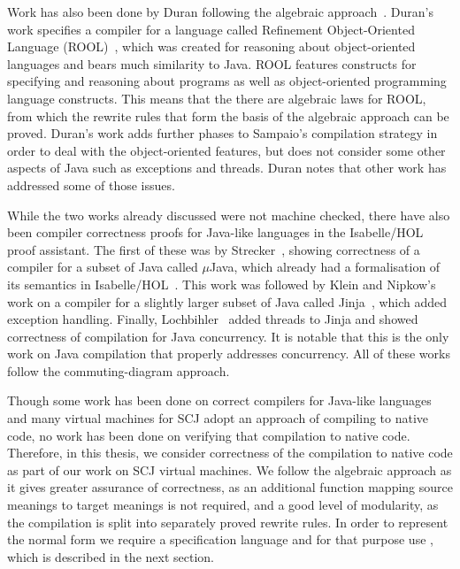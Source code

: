 Work has also been done by Duran following the algebraic
approach~\cite{duran2005, duran2010}.
Duran's work specifies a compiler for a language called Refinement
Object-Oriented Language (ROOL)~\cite{borba2000}, which was created
for reasoning about object-oriented languages and bears much
similarity to Java.
ROOL features constructs for specifying and reasoning about programs
as well as object-oriented programming language constructs.
This means that the there are algebraic laws for ROOL, from which the
rewrite rules that form the basis of the algebraic approach can be
proved.
Duran's work adds further phases to Sampaio's compilation strategy in
order to deal with the object-oriented features, but does not consider
some other aspects of Java such as exceptions and threads.
Duran notes that other work has addressed some of those issues.

While the two works already discussed were not machine checked, there
have also been compiler correctness proofs for Java-like languages in
the Isabelle/HOL proof assistant.
The first of these was by Strecker~\cite{strecker2002}, showing
correctness of a compiler for a subset of Java called $\mu$Java, which
already had a formalisation of its semantics in
Isabelle/HOL~\cite{nipkow2000}.
This work was followed by Klein and Nipkow's work on a compiler for a
slightly larger subset of Java called Jinja~\cite{klein2006}, which
added exception handling.
Finally, Lochbihler~\cite{lochbihler2010} added threads to Jinja and
showed correctness of compilation for Java concurrency.
It is notable that this is the only work on Java compilation that
properly addresses concurrency.
All of these works follow the commuting-diagram approach.

Though some work has been done on correct compilers for Java-like
languages and many virtual machines for SCJ adopt an approach of
compiling to native code, no work has been done on verifying that
compilation to native code.
Therefore, in this thesis, we consider correctness of the compilation
to native code as part of our work on SCJ virtual machines.
We follow the algebraic approach as it gives greater assurance of
correctness, as an additional function mapping source meanings to
target meanings is not required, and a good level of modularity, as
the compilation is split into separately proved rewrite rules.
In order to represent the normal form we require a specification
language and for that purpose use \Circus{}, which is described
in the next section.

\section{\Circus{}}
\label{circus-section}


